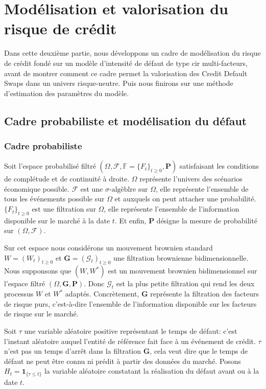 
\part{Modélisation et valorisation du risque de crédit}

Dans cette deuxième partie, nous développons un cadre de modélisation du risque de crédit fondé sur un modèle d’intensité de défaut de type \gls{cir} multi-facteurs, avant de montrer comment ce cadre permet la valorisation des Credit Default Swaps dans un univers risque-neutre. Puis nous finirons sur une méthode d'estimation des paramètres du modèle.


\chapter{Cadre probabiliste et modélisation du défaut}

\section{Cadre probabiliste}

Soit l'espace probabilisé filtré $(\Omega, \mathcal{F}, \mathbb{F} = \{F_t\}_{t \ge 0}, \mathbf{P})$ satisfaisant les conditions de complétude et de continuité à droite. $\Omega$ représente l'univers des scénarios économique possible. $\mathcal{F}$ est une $\sigma \text{-algèblre sur } \Omega$, elle représente l'ensemble de tous les événements possible sur $\Omega$ et auxquels on peut attacher une probabilité. $\{F_t\}_{t \ge 0}$ est une filtration sur $\Omega$, elle représente l'ensemble de l'information disponible sur le marché à la date $t$. Et enfin, $\mathbf{P}$ désigne la mesure de probabilité sur $(\Omega, \mathcal{F})$.


Sur cet espace nous considérons un mouvement brownien standard $W = (W_t)_{t \ge 0}$ et $\mathbf{G} = (\mathcal{G}_t)_{t \ge 0}$ une filtration brownienne bidimensionnelle. Nous supponsons que $(W, W^*)$ est un mouvement brownien bidimensionnel sur l'espace filtré $(\Omega, \mathbf{G}, \mathbf{P})$. Donc $\mathcal{G}_t$ est la plus petite filtration qui rend les deux processus $W \text{ et } W^*$ adaptés. Concrètement, $\mathbf{G}$ représente la filtration des facteurs de risque purs, c'est-à-dire l'ensemble de l'information disponible sur les facteurs de risque sur le marché.


Soit $\tau$ une variable aléatoire positive représentant le temps de défaut: c'est l'instant aléatoire auquel l'entité de référence fait face à un événement de crédit. $\tau$ n'est pas un temps d'arrêt dans la filtration $\mathbf{G}$, cela veut dire que le temps de défaut ne peut être connu ni prédit à partir des données du marché. Posons $H_t = \mathbf{1}_{\{\tau \le t\}}$ la variable aléatoire constatant la réalisation du défaut avant ou à la date $t$.


